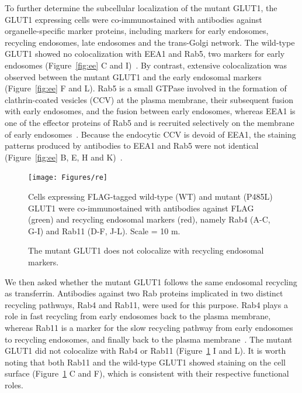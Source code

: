To further determine the subcellular localization of the mutant GLUT1, the GLUT1 expressing cells were co-immunostained with antibodies against organelle-specific marker proteins, including markers for early endosomes, recycling endosomes, late endosomes and the trans-Golgi network. The wild-type GLUT1 showed no colocalization with EEA1 and Rab5, two markers for early endosomes (Figure~\ref{fig:ee} C and I)~\cite{Mu}. By contrast, extensive colocalization was observed between the mutant GLUT1 and the early endosomal markers (Figure~\ref{fig:ee} F and L). Rab5 is a small GTPase involved in the formation of clathrin-coated vesicles (CCV) at the plasma membrane, their subsequent fusion with early endosomes, and the fusion between early endosomes, whereas EEA1 is one of the effector proteins of Rab5 and is recruited selectively on the membrane of early endosomes~\cite{Christoforidis,Rubino,Ballmer}. Because the endocytic CCV is devoid of EEA1, the staining patterns produced by antibodies to EEA1 and Rab5 were not identical (Figure~\ref{fig:ee} B, E, H and K)~\cite{Ballmer}. 

\begin{figure}[h]
\centering
\texttt{[image: Figures/re]}
\caption{The mutant GLUT1 does not colocalize with recycling endosomal markers.}
\vspace*{-3mm}
\small \justify
Cells expressing FLAG-tagged wild-type (WT) and mutant (P485L) GLUT1 were co-immunostained with antibodies against FLAG (green) and recycling endosomal markers (red), namely Rab4 (A-C, G-I) and Rab11 (D-F, J-L). Scale = 10 \textmu m.
\label{fig:re}
\end{figure}
We then asked whether the mutant GLUT1 follows the same endosomal recycling as transferrin. Antibodies against two Rab proteins implicated in two distinct recycling pathways, Rab4 and Rab11, were used for this purpose. Rab4 plays a role in fast recycling from early endosomes back to the plasma membrane, whereas Rab11 is a marker for the slow recycling pathway from early endosomes to recycling endosomes, and finally back to the plasma membrane~\cite{Grant}. The mutant GLUT1 did not colocalize with Rab4 or Rab11 (Figure~\ref{fig:re} I and L). It is worth noting that both Rab11 and the wild-type GLUT1 showed staining on the cell surface (Figure~\ref{fig:re} C and F), which is consistent with their respective functional roles. 

